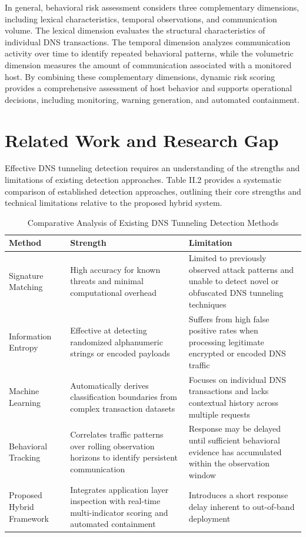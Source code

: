 \documentclass[14pt, a4paper, oneside]{report}
\begin{document}
In general, behavioral risk assessment considers three complementary dimensions, including lexical characteristics, temporal observations, and communication volume. The lexical dimension evaluates the structural characteristics of individual DNS transactions. The temporal dimension analyzes communication activity over time to identify repeated behavioral patterns, while the volumetric dimension measures the amount of communication associated with a monitored host. By combining these complementary dimensions, dynamic risk scoring provides a comprehensive assessment of host behavior and supports operational decisions, including monitoring, warning generation, and automated containment.

\section{Related Work and Research Gap}
\label{sec:related_work_gap}

Effective DNS tunneling detection requires an understanding of the strengths and limitations of existing detection approaches. Table II.2 provides a systematic comparison of established detection approaches, outlining their core strengths and technical limitations relative to the proposed hybrid system.

\begin{table}[H]
\centering
\caption{Comparative Analysis of Existing DNS Tunneling Detection Methods}
\vspace{0.1cm}
\label{tab:related_work_comparison}
\bgroup
\normalsize
\renewcommand{\arraystretch}{1.6}
\begin{tabular}{|p{2.8cm}|p{5.2cm}|p{5.2cm}|}
\hline
\textbf{Method} & \textbf{Strength} & \textbf{Limitation} \\ \hline
Signature Matching & High accuracy for known threats and minimal computational overhead & Limited to previously observed attack patterns and unable to detect novel or obfuscated DNS tunneling techniques \\ \hline
Information Entropy & Effective at detecting randomized alphanumeric strings or encoded payloads & Suffers from high false positive rates when processing legitimate encrypted or encoded DNS traffic \\ \hline
Machine Learning & Automatically derives classification boundaries from complex transaction datasets & Focuses on individual DNS transactions and lacks contextual history across multiple requests \\ \hline
Behavioral Tracking & Correlates traffic patterns over rolling observation horizons to identify persistent communication & Response may be delayed until sufficient behavioral evidence has accumulated within the observation window \\ \hline
Proposed Hybrid Framework & Integrates application layer inspection with real-time multi-indicator scoring and automated containment & Introduces a short response delay inherent to out-of-band deployment \\ \hline
\end{tabular}
\egroup
\end{table}
\end{document}
